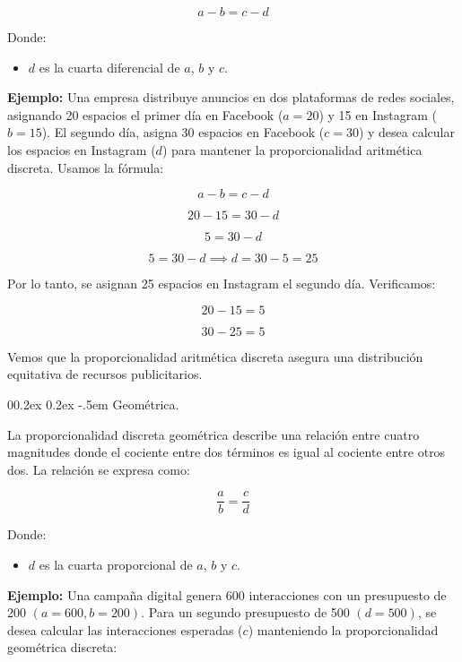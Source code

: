 \documentclass[
  stu,
  floatsintext,
  longtable,
  a4paper,
  nolmodern,
  notxfonts,
  notimes,
  colorlinks=true,linkcolor=blue,citecolor=blue,urlcolor=blue]{apa7}
\makeatletter
\renewcommand{\paragraph}{\@startsection{paragraph}{4}{\parindent}%
	{0\baselineskip \@plus 0.2ex \@minus 0.2ex}%
	{-.5em}%
	{\normalfont\normalsize\bfseries\typesectitle}}
\providecommand{\tightlist}{%
  \setlength{\itemsep}{0pt}\setlength{\parskip}{0pt}}
\makeatother
\begin{document}
\[
a - b = c - d
\]

Donde:

\begin{itemize}
\tightlist
\item
  \(d\) es la cuarta diferencial de \(a\), \(b\) y \(c\).
\end{itemize}

\textbf{Ejemplo:} Una empresa distribuye anuncios en dos plataformas de
redes sociales, asignando 20 espacios el primer día en Facebook
(\(a = 20\)) y 15 en Instagram (\(b = 15\)). El segundo día, asigna 30
espacios en Facebook (\(c = 30\)) y desea calcular los espacios en
Instagram (\(d\)) para mantener la proporcionalidad aritmética discreta.
Usamos la fórmula:

\[
a - b = c - d
\]

\[
20 - 15 = 30 - d
\]

\[
5 = 30 - d
\]

\[
5 = 30 - d \implies d = 30 - 5 = 25
\]

Por lo tanto, se asignan 25 espacios en Instagram el segundo día.
Verificamos:

\[
20 - 15 = 5
\]

\[
30 - 25 = 5
\]

Vemos que la proporcionalidad aritmética discreta asegura una
distribución equitativa de recursos publicitarios.

\paragraph{Geométrica.}\label{geomuxe9trica}

La proporcionalidad discreta geométrica describe una relación entre
cuatro magnitudes donde el cociente entre dos términos es igual al
cociente entre otros dos. La relación se expresa como:

\[
\frac{a}{b} = \frac{c}{d}
\]

Donde:

\begin{itemize}
\tightlist
\item
  \(d\) es la cuarta proporcional de \(a\), \(b\) y \(c\).
\end{itemize}

\textbf{Ejemplo:} Una campaña digital genera 600 interacciones con un
presupuesto de 200 \((a = 600, b = 200)\). Para un segundo presupuesto
de 500 \((d = 500)\), se desea calcular las interacciones esperadas
(\(c\)) manteniendo la proporcionalidad geométrica discreta:
\end{document}
